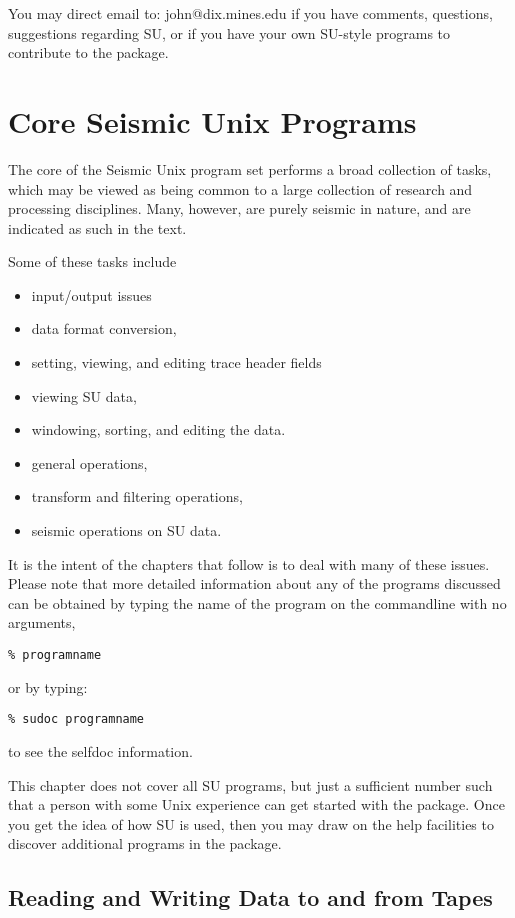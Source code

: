 {{{You may direct email to:  john@dix.mines.edu 
if you have comments, questions, suggestions regarding {\small\sf SU},
or if you have your own {\small\sf SU}-style programs to contribute
to the package.


\chapter{Core Seismic Unix Programs} 

The core of the Seismic Unix program set performs a broad
collection of tasks, which may be viewed as being common
to a large collection of research and processing disciplines.
Many, however, are purely seismic in nature, and are indicated
as such in the text.

Some of these tasks include
\begin{itemize}
\item input/output issues
\item data format conversion,
\item setting, viewing, and editing trace header fields
\item viewing SU data,
\item windowing, sorting, and editing the data.
\item general operations,
\item transform and filtering operations,
\item seismic operations on SU data.
\end{itemize}

It is the intent of the chapters that follow is to deal with
many of these issues.
Please note that more detailed information about any
of the programs discussed can be obtained by typing the name
of the program on the commandline with no arguments,
{\small\begin{verbatim}
% programname
\end{verbatim}} \noindent
or by typing:
{\small\begin{verbatim}
% sudoc programname
\end{verbatim} } \noindent
to see the selfdoc information.

This chapter does not cover all SU programs, but just a sufficient
number such that a person with some Unix experience can get started
with the package. Once you get the idea of how SU is used, then 
you may draw on the help facilities to discover additional programs
in the package.

\section{Reading and Writing Data to and from Tapes}

}}}
